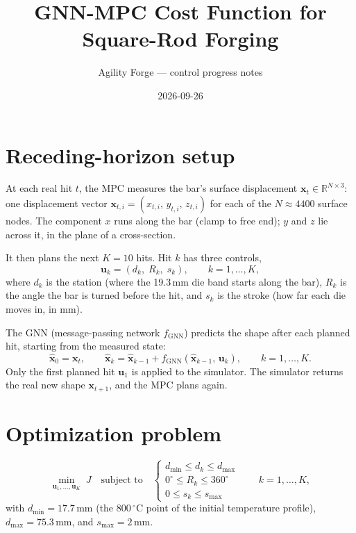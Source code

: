 \documentclass[11pt]{article}
\title{GNN-MPC Cost Function for Square-Rod Forging}
\author{Agility Forge --- control progress notes}
\date{2026-09-26}
\begin{document}
\maketitle

\section{Receding-horizon setup}

At each real hit $t$, the MPC measures the bar's surface displacement
$\mathbf{x}_t \in \mathbb{R}^{N \times 3}$: one displacement vector
$\mathbf{x}_{t,i} = (x_{t,i},\, y_{t,i},\, z_{t,i})$ for each of the
$N \approx 4400$ surface nodes. The component $x$ runs along the bar (clamp to
free end); $y$ and $z$ lie across it, in the plane of a cross-section.

It then plans the next $K = 10$ hits. Hit $k$ has three controls,
\[
  \mathbf{u}_k = (d_k,\; R_k,\; s_k), \qquad k = 1, \dots, K,
\]
where $d_k$ is the station (where the 19.3\,mm die band starts along the bar),
$R_k$ is the angle the bar is turned before the hit, and $s_k$ is the stroke
(how far each die moves in, in mm).

The GNN (message-passing network $f_{\mathrm{GNN}}$) predicts the shape after
each planned hit, starting from the measured state:
\[
  \hat{\mathbf{x}}_0 = \mathbf{x}_t, \qquad
  \hat{\mathbf{x}}_k = \hat{\mathbf{x}}_{k-1} + f_{\mathrm{GNN}}\!\left(\hat{\mathbf{x}}_{k-1},\, \mathbf{u}_k\right),
  \qquad k = 1, \dots, K.
\]
Only the first planned hit $\mathbf{u}_1$ is applied to the simulator. The
simulator returns the real new shape $\mathbf{x}_{t+1}$, and the MPC plans
again.

\section{Optimization problem}

\begin{equation}
  \min_{\mathbf{u}_1, \dots, \mathbf{u}_K} \; J
  \quad \text{subject to} \quad
  \begin{cases}
    d_{\min} \le d_k \le d_{\max} \\
    0^\circ \le R_k \le 360^\circ \\
    0 \le s_k \le s_{\max}
  \end{cases}
  \qquad k = 1, \dots, K,
\end{equation}
with $d_{\min} = 17.7$\,mm (the 800\,$^\circ$C point of the initial temperature
profile), $d_{\max} = 75.3$\,mm, and $s_{\max} = 2$\,mm.
\end{document}
